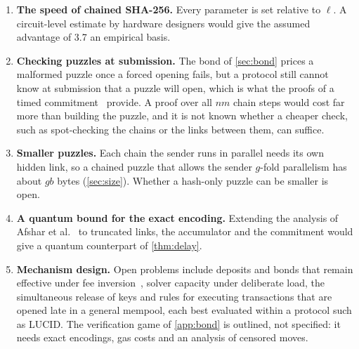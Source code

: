 \begin{enumerate}[label=\arabic*.,leftmargin=1.5em]
  \item \textbf{The speed of chained SHA-256.} Every parameter is set relative to $\ell$. A circuit-level estimate by hardware designers would give the assumed advantage of 3.7 an empirical basis.
  \item \textbf{Checking puzzles at submission.} The bond of \cref{sec:bond} prices a malformed puzzle once a forced opening fails, but a protocol still cannot know at submission that a puzzle will open, which is what the proofs of a timed commitment~\cite{BN00} provide. A proof over all $nm$ chain steps would cost far more than building the puzzle, and it is not known whether a cheaper check, such as spot-checking the chains or the links between them, can suffice.
  \item \textbf{Smaller puzzles.} Each chain the sender runs in parallel needs its own hidden link, so a chained puzzle that allows the sender $g$-fold parallelism has about $gb$ bytes (\cref{sec:size}). Whether a hash-only puzzle can be smaller is open.
  \item \textbf{A quantum bound for the exact encoding.} Extending the analysis of Afshar et al.~\cite{ACHLM23} to truncated links, the accumulator and the commitment would give a quantum counterpart of \cref{thm:delay}.
  \item \textbf{Mechanism design.} Open problems include deposits and bonds that remain effective under fee inversion~\cite{Naraghi26}, solver capacity under deliberate load, the simultaneous release of keys and rules for executing transactions that are opened late in a general mempool, each best evaluated within a protocol such as LUCID. The verification game of \cref{app:bond} is outlined, not specified: it needs exact encodings, gas costs and an analysis of censored moves.
\end{enumerate}
